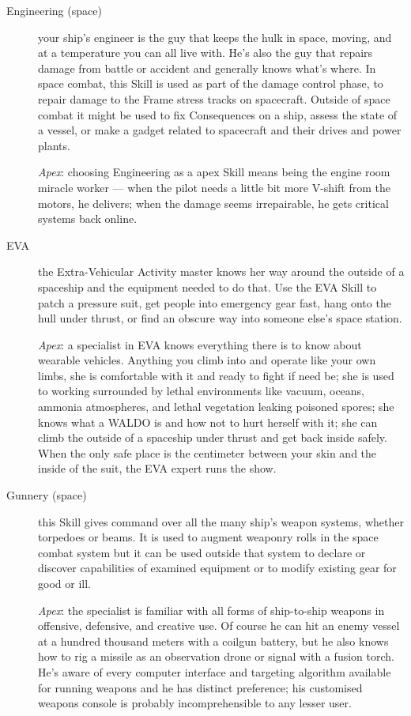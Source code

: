 \begin{description}
\item[Engineering (space)]
your ship's engineer is the guy that keeps the hulk in space, moving, and at a temperature you can all live with. He's also the guy that repairs damage from battle or accident and generally knows what's where. In space combat, this Skill is used as part of the damage control phase, to repair damage to the Frame stress tracks on spacecraft. Outside of space combat it might be used to fix Consequences on a ship, assess the state of a vessel, or make a gadget related to spacecraft and their drives and power plants.

\emph{Apex}: choosing Engineering as a apex Skill means being the engine room miracle worker --- when the pilot needs a little bit more V-shift from the motors, he delivers; when the damage seems irrepairable, he gets critical systems back online.

\item[EVA]
the Extra-Vehicular Activity master knows her way around the outside of a spaceship and the equipment needed to do that. Use the EVA Skill to patch a pressure suit, get people into emergency gear fast, hang onto the hull under thrust, or find an obscure way into someone else's space station.

\emph{Apex}: a specialist in EVA knows everything there is to know about wearable vehicles. Anything you climb into and operate like your own limbs, she is comfortable with it and ready to fight if need be; she is used to working surrounded by lethal environments like vacuum, oceans, ammonia atmospheres, and lethal vegetation leaking poisoned spores; she knows what a WALDO is and how not to hurt herself with it; she can climb the outside of a spaceship under thrust and get back inside safely. When the only safe place is the centimeter between your skin and the inside of the suit, the EVA expert runs the show.

\item[Gunnery (space)]
this Skill gives command over all the many ship's weapon systems, whether torpedoes or beams. It is used to augment weaponry rolls in the space combat system but it can be used outside that system to declare or discover capabilities of examined equipment or to modify existing gear for good or ill.

\emph{Apex}: the  specialist is familiar with all forms of ship-to-ship wea\-pons in offensive, defensive, and creative use. Of course he can hit an enemy vessel at a hundred thousand meters with a coilgun battery, but he also knows how to rig a missile as an observation drone or signal with a fusion torch. He's aware of every computer interface and targeting algorithm available for running weapons and he has distinct preference; his customised weapons console is probably incomprehensible to any lesser user.


\end{description}
